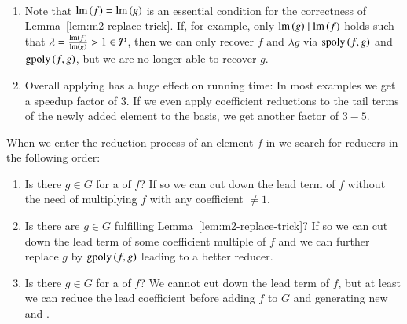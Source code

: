 \begin{remark} \
\begin{enumerate}
\item Note that $\operatorname{lm}\left({f}\right) = \operatorname{lm}\left({g}\right)$ is an essential condition for the correctness of
Lemma~\ref{lem:m2-replace-trick}. If, for example, only $\operatorname{lm}\left({g}\right) \mid \operatorname{lm}\left({f}\right)$
holds such that $\lambda = \frac{\operatorname{lm}\left({f}\right)}{\operatorname{lm}\left({g}\right)} > 1 \in \mathcal{P}$, then we can only
recover $f$ and $\lambda g$ via $\mathrm{spoly}\left({f},{g}\right)$ and $\mathrm{gpoly}\left({f},{g}\right)$, but we are no
longer able to recover $g$.
\item  Overall applying \lcrs has a huge effect on running time: In most examples we
    get a speedup factor of $3$. If we even apply coefficient reductions to the
    tail terms of the newly added element to the basis, we get another factor of
    $3-5$.
\end{enumerate}
\end{remark}

When we enter the reduction process of an element $f$ in \bba we search for
reducers in the following order:
\begin{enumerate}
\item Is there $g \in G$ for a \ltr of $f$? If so we can cut down the lead
term of $f$ without the need of multiplying $f$ with any coefficient $\neq 1$.
\item Is there are $g \in G$ fulfilling Lemma~\ref{lem:m2-replace-trick}? If so
we can cut down the lead term of some coefficient multiple of $f$ and we can
further replace $g$ by $\mathrm{gpoly}\left({f},{g}\right)$ leading to a better reducer.
\item Is there $g \in G$ for a \lcr of $f$? We cannot cut down the lead term of
$f$, but at least we can reduce the lead coefficient before adding $f$ to $G$
and generating new \spts and \gpts.
\end{enumerate}

